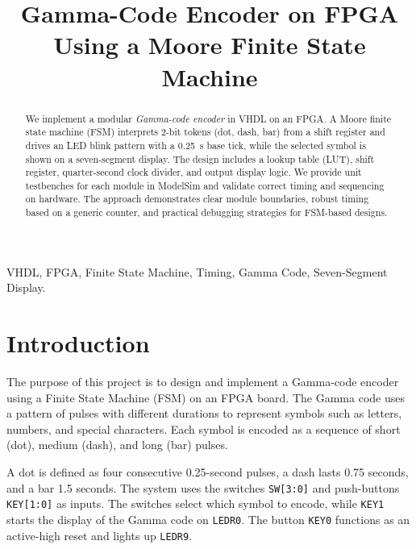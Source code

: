 \documentclass[conference]{IEEEtran}
\begin{document}
\title{Gamma-Code Encoder on FPGA Using a Moore Finite State Machine}

\author{
}

\maketitle

\begin{abstract}
We implement a modular \emph{Gamma-code encoder} in VHDL on an FPGA. A Moore finite state machine (FSM) interprets 2-bit tokens (dot, dash, bar) from a shift register and drives an LED blink pattern with a 0.25~s base tick, while the selected symbol is shown on a seven-segment display. The design includes a lookup table (LUT), shift register, quarter-second clock divider, and output display logic. We provide unit testbenches for each module in ModelSim and validate correct timing and sequencing on hardware. The approach demonstrates clear module boundaries, robust timing based on a generic counter, and practical debugging strategies for FSM-based designs.
\end{abstract}

\begin{IEEEkeywords}
VHDL, FPGA, Finite State Machine, Timing, Gamma Code, Seven-Segment Display.
\end{IEEEkeywords}

\section{Introduction}
The purpose of this project is to design and implement a Gamma-code encoder using a Finite State Machine (FSM) on an FPGA board. The Gamma code uses a pattern of pulses with different durations to represent symbols such as letters, numbers, and special characters. Each symbol is encoded as a sequence of short (dot), medium (dash), and long (bar) pulses.

A dot is defined as four consecutive 0.25-second pulses, a dash lasts 0.75 seconds, and a bar 1.5 seconds. The system uses the switches \texttt{SW[3:0]} and push-buttons \texttt{KEY[1:0]} as inputs. The switches select which symbol to encode, while \texttt{KEY1} starts the display of the Gamma code on \texttt{LEDR0}. The button \texttt{KEY0} functions as an active-high reset and lights up \texttt{LEDR9}.
\end{document}

